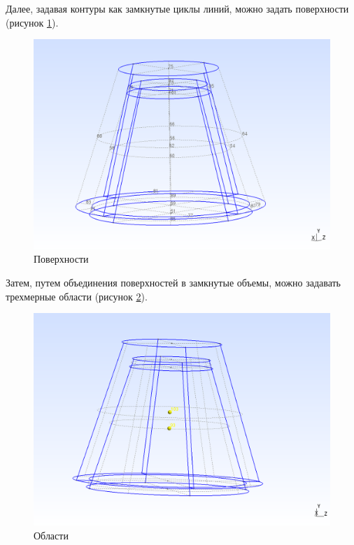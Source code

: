 \documentclass[a4paper, 14pt]{extreport}
\begin{document}
\newpage
Далее, задавая контуры как замкнутые циклы линий,
 можно задать поверхности (рисунок \ref{fig: surfaces}).

\begin{figure}[H]
	\center
	\includegraphics[scale=0.3]{pictures/surfaces.png}
	\caption{Поверхности}
	\label{fig: surfaces}
\end{figure}

Затем, путем объединения поверхностей в замкнутые объемы, можно 
задавать трехмерные области (рисунок \ref{fig: volumes}).

\begin{figure}[H]
	\center
	\includegraphics[scale=0.35]{pictures/volumes.png}
	\caption{Области}
	\label{fig: volumes}
\end{figure}
\end{document}
